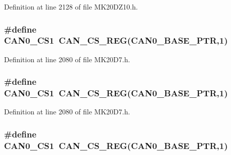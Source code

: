 Definition at line 2128 of file M\+K20\+D\+Z10.\+h.

\subsubsection[{\texorpdfstring{C\+A\+N0\+\_\+\+C\+S1}{CAN0_CS1}}]{\setlength{\rightskip}{0pt plus 5cm}\#define C\+A\+N0\+\_\+\+C\+S1~{\bf C\+A\+N\+\_\+\+C\+S\+\_\+\+R\+EG}({\bf C\+A\+N0\+\_\+\+B\+A\+S\+E\+\_\+\+P\+TR},1)}\hypertarget{group___c_a_n___register___accessor___macros_gad0255a5b502958602f62f86997315fa0}{}\label{group___c_a_n___register___accessor___macros_gad0255a5b502958602f62f86997315fa0}


Definition at line 2080 of file M\+K20\+D7.\+h.

\subsubsection[{\texorpdfstring{C\+A\+N0\+\_\+\+C\+S1}{CAN0_CS1}}]{\setlength{\rightskip}{0pt plus 5cm}\#define C\+A\+N0\+\_\+\+C\+S1~{\bf C\+A\+N\+\_\+\+C\+S\+\_\+\+R\+EG}({\bf C\+A\+N0\+\_\+\+B\+A\+S\+E\+\_\+\+P\+TR},1)}\hypertarget{group___c_a_n___register___accessor___macros_gad0255a5b502958602f62f86997315fa0}{}\label{group___c_a_n___register___accessor___macros_gad0255a5b502958602f62f86997315fa0}


Definition at line 2080 of file M\+K20\+D7.\+h.

\subsubsection[{\texorpdfstring{C\+A\+N0\+\_\+\+C\+S1}{CAN0_CS1}}]{\setlength{\rightskip}{0pt plus 5cm}\#define C\+A\+N0\+\_\+\+C\+S1~{\bf C\+A\+N\+\_\+\+C\+S\+\_\+\+R\+EG}({\bf C\+A\+N0\+\_\+\+B\+A\+S\+E\+\_\+\+P\+TR},1)}\hypertarget{group___c_a_n___register___accessor___macros_gad0255a5b502958602f62f86997315fa0}{}\label{group___c_a_n___register___accessor___macros_gad0255a5b502958602f62f86997315fa0}


